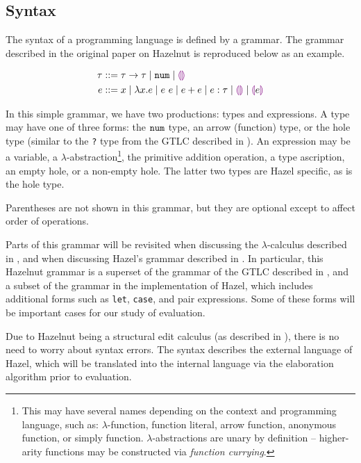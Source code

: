 \subsection{Syntax}
\label{sec:syntax}

The syntax of a programming language is defined by a grammar. The grammar described in the original paper on Hazelnut \cite{conf/popl/Hazelnut17} is reproduced below as an example.

\begin{singlespace}
  \begin{align*}
    \tau &::= \tau\to\tau
         \mid\mathtt{num}
         \mid\textcolor{violet}{\llparenthesis}\textcolor{violet}{\rrparenthesis} \\
    e &::= x
         \mid\lambda x.e
         \mid e\ e
         \mid e+e
         \mid e:\tau
         \mid\textcolor{violet}{\llparenthesis}\textcolor{violet}{\rrparenthesis}
         \mid\textcolor{violet}{\llparenthesis} e\textcolor{violet}{\rrparenthesis}
  \end{align*}
\end{singlespace}

In this simple grammar, we have two productions: types and expressions. A type may have one of three forms: the $\mathtt{num}$ type, an arrow (function) type, or the hole type (similar to the \texttt{?} type from the GTLC described in ). An expression may be a variable, a $\lambda$-abstraction\footnote{This may have several names depending on the context and programming language, such as: $\lambda$-function, function literal, arrow function, anonymous function, or simply function. $\lambda$-abstractions are unary by definition -- higher-arity functions may be constructed via \textit{function currying}.}, the primitive addition operation, a type ascription, an empty hole, or a non-empty hole. The latter two types are Hazel specific, as is the hole type.

Parentheses are not shown in this grammar, but they are optional except to affect order of operations.

Parts of this grammar will be revisited when discussing the $\lambda$-calculus described in , and when discussing Hazel's grammar described in . In particular, this Hazelnut grammar is a superset of the grammar of the GTLC described in , and a subset of the grammar in the implementation of Hazel, which includes additional forms such as \texttt{let}, \texttt{case}, and pair expressions. Some of these forms will be important cases for our study of evaluation.

Due to Hazelnut being a structural edit calculus (as described in ), there is no need to worry about syntax errors. The syntax describes the external language of Hazel, which will be translated into the internal language via the elaboration algorithm prior to evaluation.

